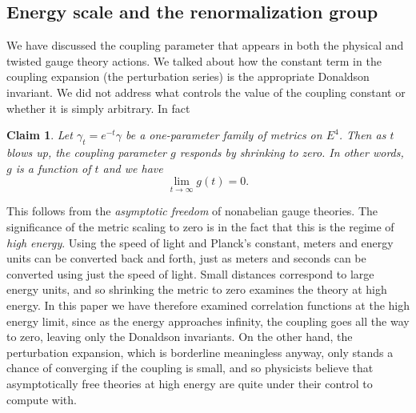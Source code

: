 \documentclass[twoside]{amsart}
\newtheorem{claim}{Claim}
\newcommand{\actions}{actions{}}
\begin{document}
\subsection{Energy scale and the renormalization group}
We have discussed the coupling parameter that appears in both the
physical and twisted gauge theory \actions.  We talked about how the
constant term in the coupling expansion (the perturbation series) is
the appropriate Donaldson invariant.  We did not address what
controls the value of the coupling constant or whether it is simply
arbitrary.  In fact
\begin{claim}
    Let \( \gamma_{t} = e^{-t}\gamma \) be a one-parameter family of
    metrics on \( E^{4} \).  Then as \( t \) blows up, the coupling
    parameter \( g \) responds by shrinking to zero.  In other words,
    \( g \) is a function of \( t \) and we have \[ \lim_{t\to
    \infty}g(t) = 0.  \]
\end{claim}
This follows from the \emph{asymptotic freedom} of nonabelian gauge
theories.  The significance of the metric scaling to zero is in the
fact that this is the regime of \emph{high energy}.  Using the speed
of light and Planck's constant, meters and energy units can be
converted back and forth, just as meters and seconds can be converted
using just the speed of light.  Small distances correspond to large
energy units, and so shrinking the metric to zero examines the theory
at high energy.  In this paper we have therefore examined correlation
functions at the high energy limit, since as the energy approaches
infinity, the coupling goes all the way to zero, leaving only the
Donaldson invariants.  On the other hand, the perturbation expansion,
which is borderline meaningless anyway, only stands a chance of
converging if the coupling is small, and so physicists believe that
asymptotically free theories at high energy are quite under their
control to compute with.
\end{document}
